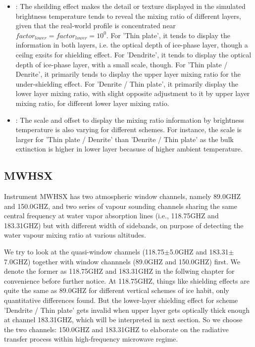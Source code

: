 \begin{itemize}
    \item {}: 
    The sheilding effect makes the detail or texture displayed in the simulated brightness temperature tends to reveal the mixing ratio of different layers, given that
the real-world profile is concentrated near $factor_{lower} = factor_{lower} = 10^{0}$.
    For 'Thin plate', it tends to display the information in both layers, i.e. the optical depth of ice-phase layer, though a ceilng exsits for shielding effect. 
    For 'Dendrite', it tends to display the optical depth of ice-phase layer, with a small scale, though.
    For 'Thin plate / Denrite', it primarily tends to display the upper layer mixing ratio for the under-shielding effect.
    For 'Denrite / Thin plate', it primarily display the lower layer mixing ratio, with slight opposite adjustment to it by upper layer mixing ratio, for different
lower layer mixing ratio.
    \item {}:
The scale and offset to display the mixing ratio information by brightness temperature is also varying for different schemes. For instance, the scale is larger for 
'Thin plate / Denrite' than 'Denrite / Thin plate' as the bulk extinction is higher in lower layer becasuse of higher ambient temperature.  
\end{itemize}

\clearpage

\subsection{MWHSX}
Instrument MWHSX has two atmospheric window channels, namely 89.0GHZ and 150.0GHZ, and two series of vapour sounding channels
sharing the same central frequency at water vapor absorption lines (i.e., 118.75GHZ and 183.31GHZ)
but with different width of sidebands, on purpose of detecting the water vapour mixing ratio at various altitudes.

We try to look at the quasi-window channels (118.75$\pm$5.0GHZ and 183.31$\pm$7.0GHZ) together with window channnels 
(89.0GHZ and 150.0GHZ) first. We denote the former as 118.75GHZ and 183.31GHZ in the follwing chapter for convenience before further notice.  
At 118.75GHZ, things like shielding effects are quite the same as 89.0GHZ for different vertical schemes of ice habit, only quantitative differences found.
But the lower-layer shielding effect for scheme 'Dendrite / Thin plate' gets invalid when upper layer gets optically thick enough
at channel 183.31GHZ, which will be interpreted in next section. So we choose the two channels: 150.0GHZ and 183.31GHZ
to elaborate on the radiative transfer process within high-frequency microwave regime. 


